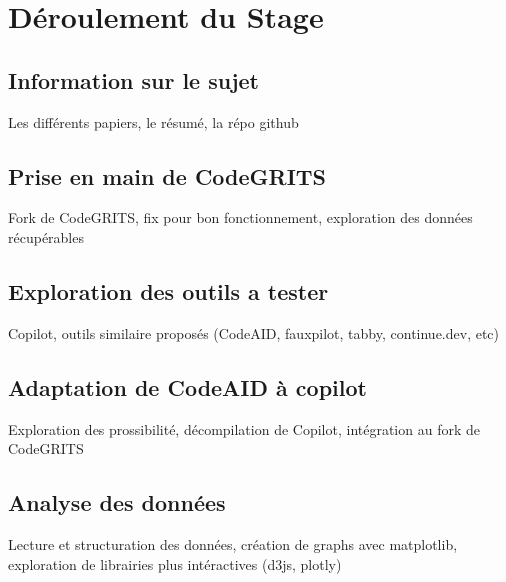 \chapter{Déroulement du Stage}
\label{main}

\section{Information sur le sujet}

Les différents papiers, le résumé, la répo github

\section{Prise en main de CodeGRITS}

Fork de CodeGRITS, fix pour bon fonctionnement, exploration des données récupérables

\section{Exploration des outils a tester}

Copilot, outils similaire proposés (CodeAID, fauxpilot, tabby, continue.dev, etc)

\section{Adaptation de CodeAID à copilot}

Exploration des prossibilité, décompilation de Copilot, intégration au fork de CodeGRITS

\section{Analyse des données}

Lecture et structuration des données, création de graphs avec matplotlib, exploration de librairies plus intéractives (d3js, plotly)
